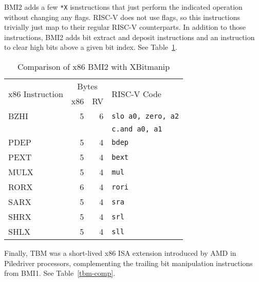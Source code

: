 BMI2 adds a few \texttt{*X} isnstructions that just perform the indicated
operation without changing any flags. RISC-V does not use flags, so this
instructions trivially just map to their regular RISC-V counterparts. In
addition to those instructions, BMI2 adds bit extract and deposit instructions
and an instruction to clear high bits above a given bit index. See Table~\ref{bmi2-comp}.

\begin{table}[h]
\centering
\begin{tabular}{lrrl}
\multirow{2}{*}{x86 Instruction} & \multicolumn{2}{c}{Bytes} & \multirow{2}{*}{RISC-V Code} \\
& x86 & RV & \\
\hline
BZHI     & 5 &  6 & {\tt slo a0, zero, a2} \\
         &   &    & {\tt c.and a0, a1} \\
\hline
PDEP     & 5 &  4 & {\tt bdep} \\
\hline
PEXT     & 5 &  4 & {\tt bext} \\
\hline
MULX     & 5 &  4 & {\tt mul} \\
\hline
RORX     & 6 &  4 & {\tt rori} \\
\hline
SARX     & 5 &  4 & {\tt sra} \\
\hline
SHRX     & 5 &  4 & {\tt srl} \\
\hline
SHLX     & 5 &  4 & {\tt sll} \\
\end{tabular}
\caption{Comparison of x86 BMI2 with XBitmanip}
\label{bmi2-comp}
\end{table}

Finally, TBM was a short-lived x86 ISA extension introduced by AMD in
Piledriver processors, complementing the trailing bit manipulation instructions
from BMI1. See Table~\ref{tbm-comp}.

